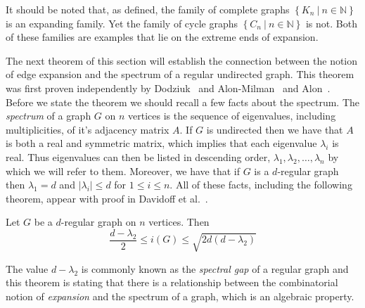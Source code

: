 It should be noted that, as defined, the family of complete graphs $\left\{ K_n \ \vert \  n \in \mathbb{N}\right\}$ is an expanding family. Yet the family of cycle graphs $\left\{ C_n \ \vert \ n \in \mathbb{N} \right\}$ is not. Both of these families are examples that lie on the extreme ends of expansion.

The next theorem of this section will establish the connection between the notion of edge expansion and the spectrum of a regular undirected graph. This theorem was first proven independently by  Dodziuk~\cite{MR743744} and Alon-Milman~\cite{Alon:1985ys} and Alon~\cite{Alon:1986fr}. Before we state the theorem we should recall a few facts about the spectrum. The {\em spectrum} of a graph $G$ on $n$ vertices is the sequence of eigenvalues, including multiplicities, of it's adjacency matrix $A$. If $G$ is undirected then we have that $A$ is both a real and symmetric matrix, which implies that each eigenvalue $\lambda_i$ is real. Thus eigenvalues can then be listed in descending order, $\lambda_1, \lambda_2,\ldots, \lambda_n$ by which we will refer to them.  Moreover, we have that if $G$ is a $d$-regular graph then $\lambda_1 = d$ and $\left\vert \lambda_i \right\vert \leq d$ for $1 \leq i \leq n$. All of these facts, including the following theorem,  appear with proof in Davidoff {et al.}~\cite{Davidoff:2003qf}. 

\begin{theorem}
 Let $G$ be a $d$-regular graph on $n$ vertices. Then \[ \frac{d - \lambda_2  }{ 2} \leq  i(G)  \leq \sqrt{2d \left(d - \lambda_2 \right) }    \] 
\label{thm:spectral_expansion}
\end{theorem}

\noindent
The value $d - \lambda_2$ is commonly known as the {\em spectral gap} of a regular graph and this theorem is stating that there is a relationship between the combinatorial notion of {\em expansion} and the spectrum of a graph, which is an algebraic property.

